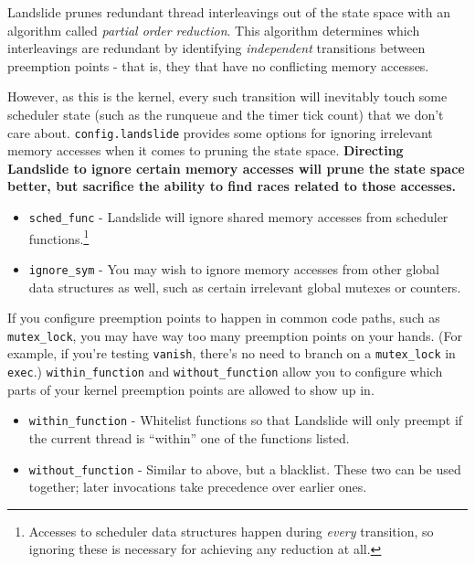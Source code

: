 \documentclass{article}
\begin{document}
Landslide prunes redundant thread interleavings out of the state space with an algorithm called {\em partial order reduction}. This algorithm determines which interleavings are redundant by identifying
{\em independent} transitions between preemption points - that is, they that have no conflicting memory accesses.

However, as this is the kernel, every such transition will inevitably touch some scheduler state (such as the runqueue and the timer tick count) that we don't care about.
\texttt{config.landslide} provides some options for ignoring irrelevant memory accesses when it comes to pruning the state space. {\bf Directing Landslide to ignore certain memory accesses will prune the state space better, but sacrifice the ability to find races related to those accesses.}

\begin{itemize}
	\item \texttt{sched\_func} - Landslide will ignore shared memory accesses from scheduler functions.\footnote{Accesses to scheduler data structures happen during {\em every} transition, so ignoring these is necessary for achieving any reduction at all.}
	\item \texttt{ignore\_sym} - You may wish to ignore memory accesses from other global data structures as well, such as certain irrelevant global mutexes or counters.
\end{itemize}

If you configure preemption points to happen in common code paths, such as \texttt{mutex\_lock}, you may have way too many preemption points on your hands. (For example, if you're testing \texttt{vanish}, there's no need to branch on a \texttt{mutex\_lock} in \texttt{exec}.) \texttt{within\_function} and \texttt{without\_function} allow you to configure which parts of your kernel preemption points are allowed to show up in.

\begin{itemize}
	\item \texttt{within\_function} - Whitelist functions so that Landslide will only preempt if the current thread is ``within'' one of the functions listed.
	\item \texttt{without\_function} - Similar to above, but a blacklist. These two can be used together; later invocations take precedence over earlier ones.
\end{itemize}
\end{document}
